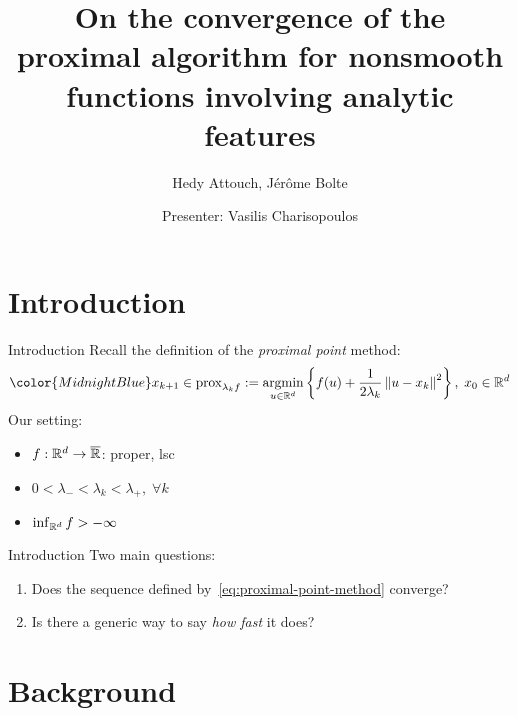 \documentclass[usenames, dvipsnames, 10pt]{beamer}
\theoremstyle{definition}
\begin{document}
\title{On the convergence of the proximal algorithm for nonsmooth functions
involving analytic features}
\subtitle{Hedy Attouch, J{\'e}r{\^o}me Bolte}
\author{Presenter: Vasilis Charisopoulos}
\frame{\titlepage}
\frame{\tableofcontents}

\allowdisplaybreaks

\section{Introduction}

\begin{frame}{Introduction}
Recall the definition of the \textit{proximal point} method:
\begin{equation}
    \color{MidnightBlue}
	x_{k+1} \in \mathrm{prox}_{\lambda_k f}
	:= \argmin_{u \in \Rbb^d} \set{
	f(u) + \frac{1}{2 \lambda_k} \norm{u - x_k}^2 }, \;
	x_0 \in \Rbb^d
	\label{eq:proximal-point-method}
\end{equation}
Our setting:
\begin{itemize}
	\item $f: \mathbb{R}^d \to \overline{\mathbb{R}}$: proper, lsc
	\item $0 < \lambda_- < \lambda_k < \lambda_+, \; \forall k$
	\item $\inf_{\mathbb{R}^d} f > -\infty$
\end{itemize}
\end{frame}

\begin{frame}{Introduction}
	Two main questions:
	\begin{enumerate}
		\item Does the sequence defined by~\cref{eq:proximal-point-method}
			converge?
		\item Is there a generic way to say \textit{how fast} it does?
	\end{enumerate}

\end{frame}

\section{Background}
\end{document}

